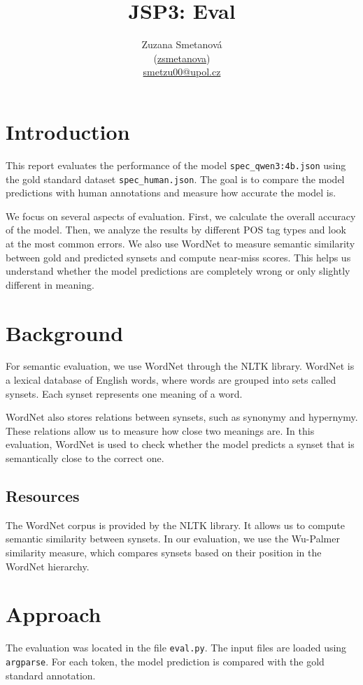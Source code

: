 \documentclass[12pt,a4paper]{article}
\title{JSP3: Eval}
\author{Zuzana Smetanová\\ 
(\href{https://github.com/zsmetanova}{zsmetanova})\\
\href{mailto:smetzu00@upol.cz}{smetzu00@upol.cz}}
\begin{document}
\maketitle

\section{Introduction}
\label{sec:introduction}
This report evaluates the performance of the model \texttt{spec\_qwen3:4b.json} using the gold standard dataset \texttt{spec\_human.json}. The goal is to compare the model predictions with human annotations and measure how accurate the model is.

We focus on several aspects of evaluation. First, we calculate the overall accuracy of the model. Then, we analyze the results by different POS tag types and look at the most common errors. We also use WordNet to measure semantic similarity between gold and predicted synsets and compute near-miss scores. This helps us understand whether the model predictions are completely wrong or only slightly different in meaning.

\section{Background}
\label{sec:background}
For semantic evaluation, we use WordNet through the NLTK library. WordNet is a lexical database of English words, where words are grouped into sets called synsets. Each synset represents one meaning of a word.

WordNet also stores relations between synsets, such as synonymy and hypernymy. These relations allow us to measure how close two meanings are. In this evaluation, WordNet is used to check whether the model predicts a synset that is semantically close to the correct one.

\subsection*{Resources}
\label{sec:resources}

The WordNet corpus is provided by the NLTK library. It allows us to compute semantic similarity between synsets. In our evaluation, we use the Wu-Palmer similarity measure, which compares synsets based on their position in the WordNet hierarchy.

\section{Approach}
\label{sec:approach}
The evaluation was located in the file \texttt{eval.py}. The input files are loaded using \texttt{argparse}. For each token, the model prediction is compared with the gold standard annotation.
\end{document}
